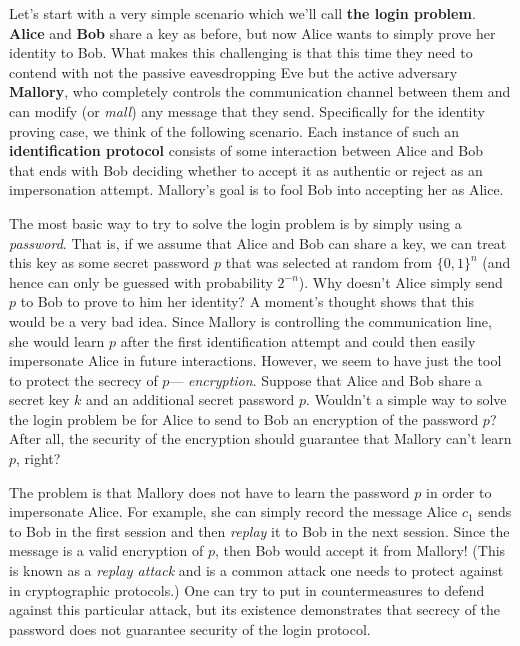 Let's start with a very simple scenario which we'll call \textbf{the
login problem}. \textbf{Alice} and \textbf{Bob} share a key as before,
but now Alice wants to simply prove her identity to Bob. What makes this
challenging is that this time they need to contend with not the passive
eavesdropping Eve but the active adversary \textbf{Mallory}, who
completely controls the communication channel between them and can
modify (or \emph{mall}) any message that they send. Specifically for the
identity proving case, we think of the following scenario. Each instance
of such an \textbf{identification protocol} consists of some interaction
between Alice and Bob that ends with Bob deciding whether to accept it
as authentic or reject as an impersonation attempt. Mallory's goal is to
fool Bob into accepting her as Alice.

The most basic way to try to solve the login problem is by simply using
a \emph{password}. That is, if we assume that Alice and Bob can share a
key, we can treat this key as some secret password \(p\) that was
selected at random from \(\{0,1\}^n\) (and hence can only be guessed
with probability \(2^{-n}\)). Why doesn't Alice simply send \(p\) to Bob
to prove to him her identity? A moment's thought shows that this would
be a very bad idea. Since Mallory is controlling the communication line,
she would learn \(p\) after the first identification attempt and could
then easily impersonate Alice in future interactions. However, we seem
to have just the tool to protect the secrecy of \(p\)---
\emph{encryption}. Suppose that Alice and Bob share a secret key \(k\)
and an additional secret password \(p\). Wouldn't a simple way to solve
the login problem be for Alice to send to Bob an encryption of the
password \(p\)? After all, the security of the encryption should
guarantee that Mallory can't learn \(p\), right?


The problem is that Mallory does not have to learn the password \(p\) in
order to impersonate Alice. For example, she can simply record the
message Alice \(c_1\) sends to Bob in the first session and then
\emph{replay} it to Bob in the next session. Since the message is a
valid encryption of \(p\), then Bob would accept it from Mallory! (This
is known as a \emph{replay attack} and is a common attack one needs to
protect against in cryptographic protocols.) One can try to put in
countermeasures to defend against this particular attack, but its
existence demonstrates that secrecy of the password does not guarantee
security of the login protocol.

